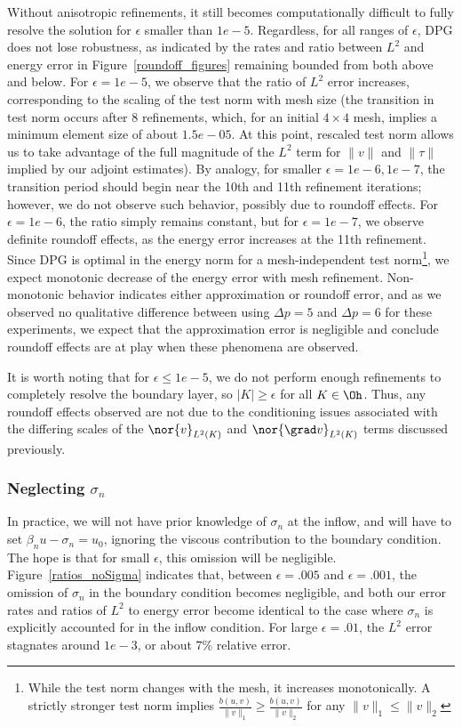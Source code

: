Without anisotropic refinements, it still becomes computationally difficult to fully resolve the solution for $\epsilon$ smaller than $1e-5$. Regardless, for all ranges of $\epsilon$, DPG does not lose robustness, as indicated by the rates and ratio between $L^2$ and energy error in Figure~\ref{roundoff_figures} remaining bounded from both above and below. For $\epsilon = 1e-5$, we observe that the ratio of $L^2$ error increases, corresponding to the scaling of the test norm with mesh size (the transition in test norm occurs after 8 refinements, which, for an initial $4\times 4$ mesh, implies a minimum element size of about $1.5e-05$. At this point, rescaled test norm allows us to take advantage of the full magnitude of the $L^2$ term for $\|v\|$ and $\|\tau\|$ implied by our adjoint estimates). By analogy, for smaller $\epsilon = 1e-6, 1e-7$, the transition period should begin near the 10th and 11th refinement iterations; however, we do not observe such behavior, possibly due to roundoff effects. 
For $\epsilon=1e-6$, the ratio simply remains constant, but for $\epsilon=1e-7$, we observe definite roundoff effects, as the energy error increases at the 11th refinement. Since DPG is optimal in the energy norm for a mesh-independent test norm\footnote{While the test norm changes with the mesh, it increases monotonically. A strictly stronger test norm implies $\frac{b(u,v)}{\|v\|_1} \geq \frac{b(u,v)}{\|v\|_2}$ for any $\|v\|_1 \leq \|v\|_2$}, we expect monotonic decrease of the energy error with mesh refinement. Non-monotonic behavior indicates either approximation or roundoff error, and as we observed no qualitative difference between using $\Delta p = 5$ and $\Delta p = 6$ for these experiments, we expect that the approximation error is negligible and conclude roundoff effects are at play when these phenomena are observed. 

It is worth noting that for $\epsilon \leq 1e-5$, we do not perform enough refinements to completely resolve the boundary layer, so $|K| \geq \epsilon$ for all $K\in \Oh$. Thus, any roundoff effects observed are not due to the conditioning issues associated with the differing scales of the $\nor{v}_{L^2(K)}$ and $\nor{\grad v}_{L^2(K)}$ terms discussed previously. 

\subsubsection{Neglecting $\sigma_n$}

In practice, we will not have prior knowledge of $\sigma_n$ at the inflow, and will have to set $\beta_n u - \sigma_n = u_0$, ignoring the viscous contribution to the boundary condition.  The hope is that for small $\epsilon$, this omission will be negligible. Figure~\ref{ratios_noSigma} indicates that, between $\epsilon = .005$ and $\epsilon = .001$, the omission of $\sigma_n$ in the boundary condition becomes negligible, and both our error rates and ratios of $L^2$ to energy error become identical to the case where $\sigma_n$ is explicitly accounted for in the inflow condition. For large $\epsilon = .01$, the $L^2$ error stagnates around $1e-3$, or about $7\%$ relative error. 

